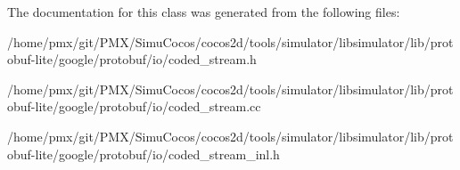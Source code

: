 The documentation for this class was generated from the following files\+:\begin{DoxyCompactItemize}
\item 
/home/pmx/git/\+P\+M\+X/\+Simu\+Cocos/cocos2d/tools/simulator/libsimulator/lib/protobuf-\/lite/google/protobuf/io/coded\+\_\+stream.\+h\item 
/home/pmx/git/\+P\+M\+X/\+Simu\+Cocos/cocos2d/tools/simulator/libsimulator/lib/protobuf-\/lite/google/protobuf/io/coded\+\_\+stream.\+cc\item 
/home/pmx/git/\+P\+M\+X/\+Simu\+Cocos/cocos2d/tools/simulator/libsimulator/lib/protobuf-\/lite/google/protobuf/io/coded\+\_\+stream\+\_\+inl.\+h\end{DoxyCompactItemize}
